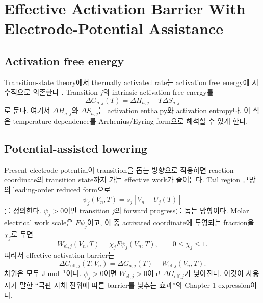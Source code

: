 \documentclass[11pt]{article}
\newcommand{\eff}{\mathrm{eff}}
\begin{document}
\section{Effective Activation Barrier With Electrode-Potential Assistance}\label{sec:barrier}

\subsection{Activation free energy}\label{subsec:activation}

Transition-state theory에서 thermally activated rate는 activation free energy에 지수적으로 의존한다
\cite{eyring1935,evanspolanyi1935}. Transition \(j\)의 intrinsic activation free energy를
\begin{equation}
\Delta G_{a,j}(T)
=
\Delta H_{a,j}-T\Delta S_{a,j}
\label{eq:delta_ga}
\end{equation}
로 둔다. 여기서 \(\Delta H_{a,j}\)와 \(\Delta S_{a,j}\)는 activation enthalpy와 activation
entropy다. 이 식은 temperature dependence를 Arrhenius/Eyring form으로 해석할 수 있게 한다.

\subsection{Potential-assisted lowering}\label{subsec:potential_assist}

Present electrode potential이 transition을 돕는 방향으로 작용하면 reaction coordinate의 transition
state까지 가는 effective work가 줄어든다. Tail region 근방의 leading-order reduced form으로
\begin{equation}
\psi_j(V_n,T)=s_j[V_n-U_j(T)]
\label{eq:psi}
\end{equation}
를 정의한다. \(\psi_j>0\)이면 transition \(j\)의 forward progress를 돕는 방향이다. Molar
electrical work scale은 \(F\psi_j\)이고, 이 중 activated coordinate에 투영되는 fraction을
\(\chi_j\)로 두면
\begin{equation}
W_{\mathrm{el},j}(V_n,T)
=
\chi_j F\psi_j(V_n,T),
\qquad
0\le\chi_j\le1.
\label{eq:wel}
\end{equation}
따라서 effective activation barrier는
\begin{equation}
\boxed{
\Delta G_{\eff,j}(T,V_n)
=
\Delta G_{a,j}(T)
-
W_{\mathrm{el},j}(V_n,T).
}
\label{eq:geff}
\end{equation}
차원은 모두 J mol\(^{-1}\)이다. \(\psi_j>0\)이면 \(W_{\mathrm{el},j}>0\)이고
\(\Delta G_{\eff,j}\)가 낮아진다. 이것이 사용자가 말한 ``극판 자체 전위에 따른 barrier를 낮추는
효과''의 Chapter 1 expression이다.
\end{document}
